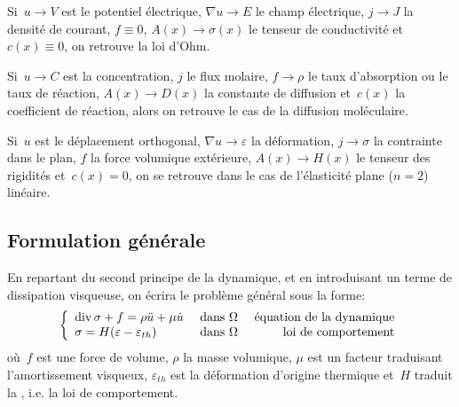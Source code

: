 \medskip
Si~$u\longrightarrow V$ est le potentiel électrique, $\nabla u\longrightarrow E$ le champ électrique, $j\longrightarrow J$ la densité de courant, $f\equiv 0$, $A(x) \longrightarrow\sigma(x)$ le tenseur de conductivité et~$c(x)\equiv 0$, on retrouve la loi d'Ohm.

\medskip
Si~$u\longrightarrow C$ est la concentration, $j$ le flux molaire, $f\longrightarrow\rho$ le taux d'absorption ou le taux de réaction, $A(x)\longrightarrow D(x)$ la constante de diffusion et~$c(x)$ la coefficient de réaction, alors on retrouve le cas de la diffusion moléculaire.

\medskip
Si~$u$ est le déplacement orthogonal, $\nabla u\longrightarrow\varepsilon$ la déformation, $j\longrightarrow\sigma$ la contrainte dans le plan, $f$ la force volumique extérieure, $A(x)\longrightarrow H(x)$ le tenseur des rigidités et~$c(x)=0$, on se retrouve dans le cas de l'élasticité plane ($n=2$) linéaire.

\medskip
\subsection{Formulation générale}

En repartant du second principe de la dynamique, et en introduisant un terme de dissipation visqueuse, on écrira le problème général sous la forme:
\begin{equation}
\left\{
\begin{array}{llr}
\operatorname{div}\sigma + f = \rho \ddot{u} + \mu \dot{u} & \text{ dans } \Omega & \text{ équation de la dynamique}\\
\sigma=H(\varepsilon-\varepsilon_{th}) & \text{ dans } \Omega & \text{ loi de comportement}\\
\end{array}
\right.
\end{equation}
où~$f$ est une force de volume, $\rho$ la masse volumique, $\mu$ est un facteur traduisant l'amortissement visqueux, $\varepsilon_{th}$ est la déformation d'origine thermique et~$H$ traduit la , i.e. la loi de comportement.


